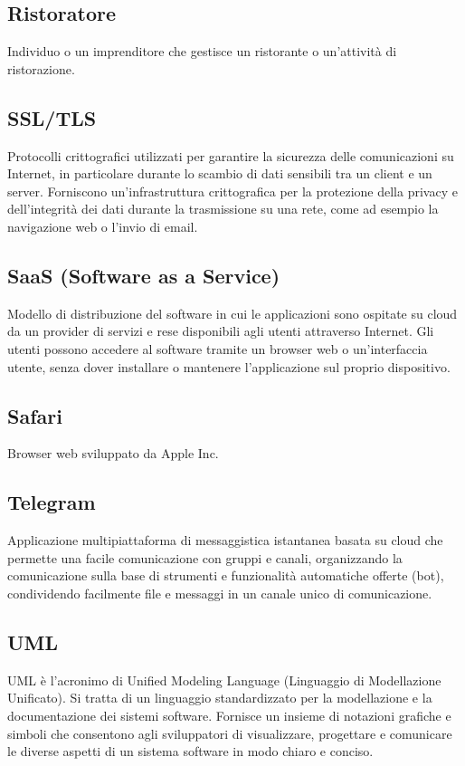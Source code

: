 \subsection{Ristoratore}Individuo o un imprenditore che gestisce un ristorante o un'attività di ristorazione.
\subsection{SSL/TLS}Protocolli crittografici utilizzati per garantire la sicurezza delle comunicazioni su Internet, in particolare durante lo scambio di dati sensibili tra un client e un server. Forniscono un'infrastruttura crittografica per la protezione della privacy e dell'integrità dei dati durante la trasmissione su una rete, come ad esempio la navigazione web o l'invio di email.
\subsection{SaaS (Software as a Service)}Modello di distribuzione del software in cui le applicazioni sono ospitate su cloud da un provider di servizi e rese disponibili agli utenti attraverso Internet. Gli utenti possono accedere al software tramite un browser web o un'interfaccia utente, senza dover installare o mantenere l'applicazione sul proprio dispositivo.
\subsection{Safari}Browser web sviluppato da Apple Inc.
\subsection{Telegram}Applicazione multipiattaforma di messaggistica istantanea basata su cloud che permette una facile comunicazione con gruppi e canali, organizzando la comunicazione sulla base di strumenti e funzionalità automatiche offerte (bot), condividendo facilmente file e messaggi in un canale unico di comunicazione.
\subsection{UML}UML è l'acronimo di Unified Modeling Language (Linguaggio di Modellazione Unificato). Si tratta di un linguaggio standardizzato per la modellazione e la documentazione dei sistemi software. Fornisce un insieme di notazioni grafiche e simboli che consentono agli sviluppatori di visualizzare, progettare e comunicare le diverse aspetti di un sistema software in modo chiaro e conciso.
